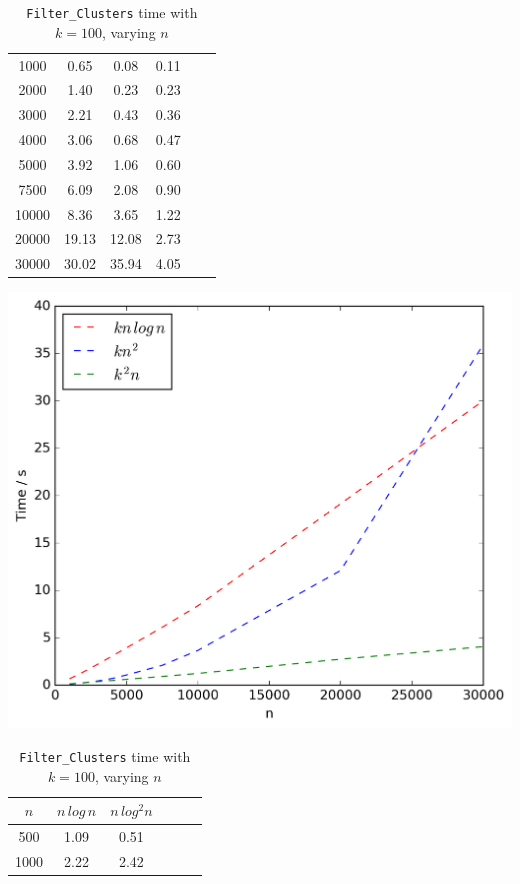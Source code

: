 \documentclass[final,1p,times]{elsarticle}
\begin{document}
\begin{table}[!ht]
\begin{minipage}{0.48\textwidth}
\begin{tabular}{c||ccccc}
                \hline\hline
                1000 & 0.65 & 0.08 & 0.11\\
                2000 & 1.40 & 0.23 & 0.23\\
                3000 & 2.21 & 0.43 & 0.36\\
                4000 & 3.06 & 0.68 & 0.47\\
                5000 & 3.92 & 1.06 & 0.60\\
                7500 & 6.09 & 2.08 & 0.90\\
                10000 & 8.36 & 3.65 & 1.22\\
                20000 & 19.13 & 12.08 & 2.73\\
                30000 & 30.02 & 35.94 & 4.05\\
            \end{tabular}
            \includegraphics[scale=0.4]{varyingn1_weighting}
        \end{minipage}\hfill
        \begin{minipage}{0.48\textwidth}
            \centering
            \caption{\texttt{Filter\_Clusters} time with $k = 100$, varying $n$}
            \label{tab:filtern1}
            \begin{tabular}{c||ccccc}
                $n$ & $n\,log\,n$ & $n\,log^2n$\\
                \hline\hline
                500 & 1.09 & 0.51\\
                1000 & 2.22 & 2.42\\

\end{tabular}
\end{minipage}
\end{table}
\end{document}
